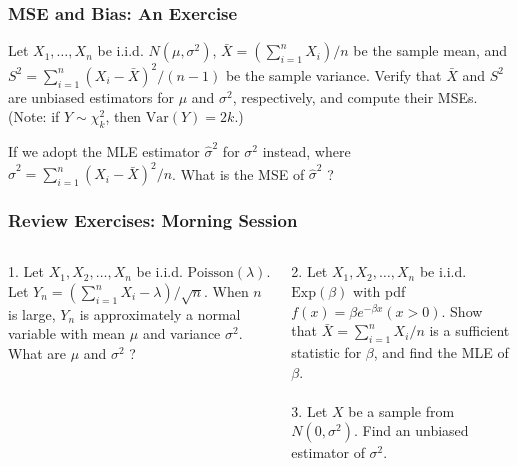 \documentclass{beamer}
\begin{document}
\begin{frame}
\frametitle{MSE and Bias: An Exercise}
Let $X_1,\ldots,X_n$ be i.i.d. $N(\mu,\sigma^2)$, $\bar{X}=(\sum_{i=1}^n X_i)/n$ be the sample mean, and $S^2=\sum_{i=1}^n (X_i-\bar{X})^2/(n-1)$ be the sample variance. Verify that $\bar{X}$ and $S^2$ are unbiased estimators for $\mu$ and $\sigma^2$, respectively, and compute their MSEs.\\
(Note: if $Y \sim \chi^2_k$, then $\text{Var}(Y)=2k$.)
\vspace*{0.6in}

If we adopt the MLE estimator $\hat{\sigma}^2$ for $\sigma^2$ instead, where $\hat{\sigma}^2=\sum_{i=1}^n (X_i-\bar{X})^2/n$. What is the MSE of $\hat{\sigma}^2$ ?
\vspace*{0.6in}
\end{frame}


\begin{frame}
\frametitle{Review Exercises: Morning Session}
\begin{columns}[t]
1. Let $X_1,X_2,\ldots,X_n$ be i.i.d. $\text{Poisson}(\lambda)$. Let $Y_n = (\sum_{i=1}^n X_i - \lambda)/\sqrt{n}$. When $n$ is large, $Y_n$ is approximately a normal variable with mean $\mu$ and variance $\sigma^2$. What are $\mu$ and $\sigma^2$ ?

2. Let $X_1,X_2,\ldots,X_n$ be i.i.d. $\text{Exp}(\beta)$ with pdf $f(x)=\beta e^{-\beta x} (x > 0)$. Show that $\bar{X} = \sum_{i=1}^n X_i/n$ is a sufficient statistic for $\beta$, and find the MLE of $\beta$.
\\~\\
3. Let $X$ be a sample from $N(0,\sigma^2)$. Find an unbiased estimator of $\sigma^2$.

\end{columns}
\end{frame}
\end{document}
